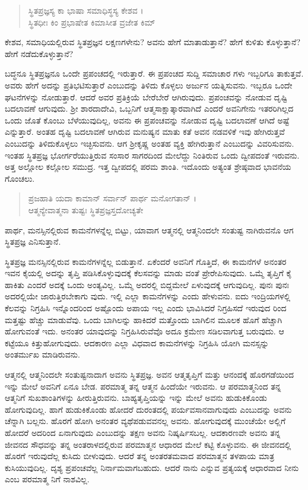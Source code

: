 \begin{verse}
ಸ್ಥಿತಪ್ರಜ್ಞಸ್ಯ ಕಾ ಭಾಷಾ ಸಮಾಧಿಸ್ಥಸ್ಯ ಕೇಶವ ।\\ಸ್ಥಿತಧೀಃ ಕಿಂ ಪ್ರಭಾಷೇತ ಕಿಮಾಸೀತ ವ್ರಜೇತ ಕಿಮ್ 
\end{verse}

{\small ಕೇಶವ, ಸಮಾಧಿಯಲ್ಲಿರುವ ಸ್ಥಿತಪ್ರಜ್ಞನ ಲಕ್ಷಣಗಳೇನು? ಅವನು ಹೇಗೆ ಮಾತಾಡುತ್ತಾನೆ? ಹೇಗೆ ಕುಳಿತು ಕೊಳ್ಳುತ್ತಾನೆ? ಹೇಗೆ ನಡೆದುಕೊಳ್ಳುತ್ತಾನೆ?}

ಬದ್ಧನೂ ಸ್ಥಿತಪ್ರಜ್ಞನೂ ಒಂದೇ ಪ್ರಪಂಚದಲ್ಲಿ ಇರುತ್ತಾರೆ. ಈ ಪ್ರಪಂಚದ ಸುದ್ದಿ ಸಮಾಚಾರ ಗಳು ಇಬ್ಬರಿಗೂ ತಾಕುತ್ತವೆ. ಅವರು ಹೇಗೆ ಅದನ್ನು ಪ್ರತಿಭಟಿಸುತ್ತಾರೆ ಎಂಬುದನ್ನು ತಿಳಿದು ಕೊಳ್ಳಲು ಅರ್ಜುನ ಯತ್ನಿಸುವನು. ಇಬ್ಬರೂ ಒಂದೇ ಘಟನೆಗಳನ್ನು ನೋಡುತ್ತಾರೆ. ಆದರೆ ಅವರ ಪ್ರತಿಕ್ರಿಯೆ ಬೇರೆಬೇರೆ ಆಗಿರುವುದು. ಪ್ರಪಂಚವನ್ನು ನೋಡುವ ದೃಷ್ಟಿ ಬದಲಾವಣೆ ಆಗುವುದು. ಶ್ರೀ ಶಾರದಾದೇವಿ, ಒಬ್ಬನಿಗೆ ಆತ್ಮಸಾಕ್ಷಾತ್ಕಾರವಾಗಿದೆ ಎಂದರೆ ಅವನಿಗೇನು ಇತರರಿಗಿಲ್ಲದ ಒಂದು ಜೊತೆ ಕೊಂಬು ಬೆಳೆಯುವುದಿಲ್ಲ, ಅವನು ಈ ಪ್ರಪಂಚವನ್ನು ನೋಡುವ ದೃಷ್ಟಿ ಬದಲಾವಣೆ ಆಗಿದೆ ಅಷ್ಟೆ ಎನ್ನುತ್ತಾರೆ. ಅಂತಹ ದೃಷ್ಟಿ ಬದಲಾವಣೆ ಆಗಿರುವ ಮನುಷ್ಯನ ಮಾತು ಕತೆ ಅವನ ನಡವಳಿಕೆ ಇವು ಹೇಗಿರುತ್ತವೆ ಎಂಬುದನ್ನು ತಿಳಿದುಕೊಳ್ಳಲು ಇಚ್ಛಿಸುವನು. ಆಗ ಶ್ರೀಕೃಷ್ಣ ಅಂತಹ ವ್ಯಕ್ತಿ ಹೇಗಿರುತ್ತಾನೆ ಎಂಬುದನ್ನು ವಿವರಿಸುವನು. ಇಂತಹ ಸ್ಥಿತಪ್ರಜ್ಞ ಭೋರ್ಗರೆಯುತ್ತಿರುವ ಸಂಸಾರ ಸಾಗರದಿಂದ ಮೇಲೆದ್ದು ನಿಂತಿರುವ ಒಂದು ದ್ವೀಪದಂತೆ ಇರುವನು. ಅತ್ತ ಅಲ್ಲೋಲ ಕಲ್ಲೋಲ ಸಮುದ್ರ. ಇತ್ತ ದ್ವೀಪದಲ್ಲಿ ಪರಮ ಶಾಂತಿ. ಇದೊಂದು ಅತ್ಯಂತ ಶ್ರೇಷ್ಠವಾದ ಭಾವನೆಯ ಗೊಂಚಲು.

\begin{verse}
ಪ್ರಜಹಾತಿ ಯದಾ ಕಾಮಾನ್ ಸರ್ವಾನ್ ಪಾರ್ಥ ಮನೋಗತಾನ್ ।\\ಆತ್ಮನ್ಯೇವಾತ್ಮನಾ ತುಷ್ಟಃ ಸ್ಥಿತಪ್ರಜ್ಞಸ್ತದೋಚ್ಯತೇ 
\end{verse}

{\small ಪಾರ್ಥ, ಮನಸ್ಸಿನಲ್ಲಿರುವ ಕಾಮನೆಗಳನ್ನೆಲ್ಲ ಬಿಟ್ಟು, ಯಾವಾಗ ಆತ್ಮನಲ್ಲಿ ಆತ್ಮನಿಂದಲೇ ಸಂತುಷ್ಟ ನಾಗಿರುವನೊ ಆಗ ಸ್ಥಿತಪ್ರಜ್ಞ ಎನಿಸುತ್ತಾನೆ.}

ಸ್ಥಿತಪ್ರಜ್ಞ ಮನಸ್ಸಿನಲ್ಲಿರುವ ಕಾಮನೆಗಳನ್ನೆಲ್ಲ ಬಿಡುತ್ತಾನೆ. ಏಕೆಂದರೆ ಅವನಿಗೆ ಗೊತ್ತಿದೆ, ಈ ಕಾಮನೆಗಳೆ ಅನಂತರ ಇವನ ಕೈಯಲ್ಲಿ ಅದನ್ನು ತೃಪ್ತಿ ಪಡಿಸಿಕೊಳ್ಳುವುದಕ್ಕೆ ಕೆಲಸವನ್ನು ಮಾಡು ವಂತೆ ಪ್ರೇರೇಪಿಸುವುದು. ಒಮ್ಮೆ ತೃಪ್ತಿಗೆ ಕೈ ಹಾಕಿತು ಎಂದರೆ ಅದಕ್ಕೆ ಒಂದು ಅಂತ್ಯವಿಲ್ಲ. ಒಮ್ಮೆ ಅದರಲ್ಲಿ ಬಿದ್ದಮೇಲೆ ಏಳುವುದಕ್ಕೆ ಆಗುವುದಿಲ್ಲ. ಪುನಃ ಪುನಃ ಅದರಲ್ಲಿಯೇ ಜಾರುತ್ತಿರಬೇಕಾಗು ವುದು. ಇಲ್ಲಿ ಎಲ್ಲಾ ಕಾಮನೆಗಳನ್ನು ಎಂದು ಹೇಳುವನು. ಐದು ಇಂದ್ರಿಯಗಳಲ್ಲಿ ಕೆಲವನ್ನು ನಿಗ್ರಹಿಸಿ ಇನ್ನೊಂದರಿಂದ ಅಷ್ಟೊಂದು ಅಪಾಯ ಇಲ್ಲ ಎಂದು ಭಾವಿಸಿದರೆ ನಿಗ್ರಹಿಸದೆ ಇರುವುದ ರಿಂದ ಮತ್ತಷ್ಟು ಹೆಚ್ಚು ಮಾಡುವೆವು. ಒಂದು ಬಾಗಿಲನ್ನು ಹಾಕಿದರೆ ಮತ್ತೊಂದು ಬಾಗಿಲಿನ ಮೂಲಕ ಹೊಗೆ ಹೆಚ್ಚಾಗಿ ಹೋಗುವಂತೆ ಇದು. ಅನಂತರ ಯಾವುದನ್ನು ನಿಗ್ರಹಿಸಿರುವೆವೊ ಅದೂ ಕ್ರಮೇಣ ಸಡಿಲವಾಗುತ್ತ ಬರುವುದು. ಆ ಕಟ್ಟೆಯೂ ಕಿತ್ತುಹೋಗುವುದು. ಆದಕಾರಣ ಎಲ್ಲಾ ವಿಧವಾದ ಕಾಮನೆಗಳನ್ನು ನಿಗ್ರಹಿಸಿ ಯೋಗಿ ಮನಸ್ಸನ್ನು ಅಂತರ್ಮುಖ ಮಾಡಿರುವನು.

ಆತ್ಮನಲ್ಲಿ ಆತ್ಮನಿಂದಲೇ ಸಂತುಷ್ಟನಾದಾಗ ಅವನು ಸ್ಥಿತಪ್ರಜ್ಞ. ಅವನ ಆತ್ಮತೃಪ್ತಿಗೆ ಮತ್ತು ಆನಂದಕ್ಕೆ ಹೊರಗಡೆಯಿಂದ ಇನ್ನು ಮೇಲೆ ಅವನಿಗೆ ಏನೂ ಬೇಡ. ಪರಮಾತ್ಮ ತನ್ನ ಆತ್ಮನ ಹಿಂದೆಯೇ ಇರುವನು. ಆ ಪರಮಾತ್ಮನಿಂದ ತನ್ನ ಆತ್ಮನಿಗೆ ಸುಖಶಾಂತಿಗಳನ್ನು ಹೀರುತ್ತಿರುವನು. ಬಾಹ್ಯತೃಪ್ತಿಯನ್ನು ಇನ್ನು ಮೇಲೆ ಅವನು ಹುಡುಕಿಕೊಂಡು ಹೋಗುವುದಿಲ್ಲ. ಹಾಗೆ ಹುಡುಕಿಕೊಂಡು ಹೋದರೆ ದುರಂತದಲ್ಲಿ ಪರ್ಯವಸಾನವಾಗುವುದು ಎಂಬುದನ್ನು ಅವನು ಚೆನ್ನಾಗಿ ಬಲ್ಲನು. ಹೊರಗೆ ಹೋಗಿ ಅನಂತರ ವ್ಯಥೆಪಡುವವನಲ್ಲ ಅವನು. ಹೋಗುವುದಕ್ಕೆ ಮುಂಚೆಯೇ ಅಲ್ಲಿಗೆ ಹೋದರೆ ಅದರಿಂದ ಏನಾಗುವುದು ಎಂಬುದನ್ನು ತಕ್ಷಣ ಅವನು ನಿಷ್ಕರ್ಷಿಸಬಲ್ಲ. ಆದಕಾರಣವೇ ಅವನು ತನ್ನ ಜೀವನದ ಸೌಧವನ್ನು ತನ್ನ ಅಂತರಾಳದಲ್ಲಿರುವ ಪರಮಾತ್ಮನ ಆಧಾರದ ಮೇಲೆ ಕಟ್ಟಿ ಕೊಳ್ಳುವನು. ಈ ಜೀವನದಲ್ಲಿ ಹೊರಗೆ ಇರುವುದೆಲ್ಲ ಕುಸಿದು ಬೀಳುವುದು. ಆದರೆ ತನ್ನ ಅಂತರತಮವಾದ ಪರಮಾತ್ಮನ ತಳಪಾಯ ಮಾತ್ರ ಕುಸಿಯುವುದಿಲ್ಲ. ದೃಶ್ಯ ಪ್ರಪಂಚವೆಲ್ಲ ನಿರ್ನಾಮವಾಗಬಹುದು. ಆದರೆ ನಾನು ಎನ್ನುವ ಪ್ರತ್ಯಯಕ್ಕೆ ಆಧಾರವಾದ ನೀನು ಎಂಬ ಪರಮಾತ್ಮ ನಿಗೆ ನಾಶವಿಲ್ಲ.

